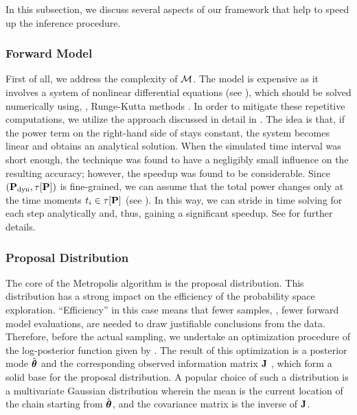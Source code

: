 In this subsection, we discuss several aspects of our framework that help to speed up the inference procedure.

\subsubsection{Forward Model} 
First of all, we address the complexity of $\model$. The model is expensive as it involves a system of nonlinear differential equations (see ), which should be solved numerically using, \eg, Runge-Kutta methods \cite{press2007}. In order to mitigate these repetitive computations, we utilize the approach discussed in detail in \cite{ukhov2012}.
The idea is that, if the power term on the right-hand side of  stays constant, the system becomes linear and obtains an analytical solution. When the simulated time interval was short enough, the technique was found to have a negligibly small influence on the resulting accuracy; however, the speedup was found to be considerable.
Since $(\mathbf{P}_{\text{dyn}}, \tau[\mathbf{P}])$ is fine-grained, we can assume that the total power changes only at the time moments $t_i \in \tau[\mathbf{P}]$ (see ). In this way, we can stride in time solving  for each step analytically and, thus, gaining a significant speedup. See \cite{ukhov2012} for further details.

\subsubsection{Proposal Distribution} 
The core of the Metropolis algorithm is the proposal distribution. This distribution has a strong impact on the efficiency of the probability space exploration. ``Efficiency'' in this case means that fewer samples, \ie, fewer forward model evaluations, are needed to draw justifiable conclusions from the data.
Therefore, before the actual sampling, we undertake an optimization procedure of the log-posterior function given by . The result of this optimization is a posterior mode $\hat{{\boldsymbol\theta}}$ and the corresponding observed information matrix $\mathbf{J}$ \cite{gelman2004}, which form a solid base for the proposal distribution.
A popular choice of such a distribution is a multivariate Gaussian distribution wherein the mean is the current location of the chain starting from $\hat{{\boldsymbol\theta}}$, and the covariance matrix is the inverse of $\mathbf{J}$.

